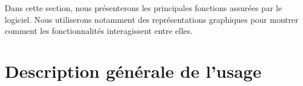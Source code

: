 Dans cette section, nous présenterons les principales fonctions assurées par le logiciel. Nous utiliserons notamment des représentations graphiques pour montrer comment les fonctionnalités interagissent entre elles.

\section{Description générale de l'usage}